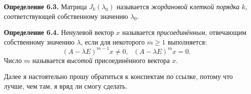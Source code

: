 \documentclass[a4paper, 12pt]{article}
\begin{document}
\begin{spacing}{1.5}
\textbf{Определение 6.3.} Матрица $J_k (\lambda_0)$ называется \textit{жордановой клеткой порядка} $k$, соответствующей собственному значению $\lambda_0$.

\textbf{Определение 6.4.} Ненулевой вектор $x$ называется \textit{присоединённым}, отвечающим собственному значению $\lambda$, если для некоторого $m \geq 1$ выполняется:
$$(A - \lambda E)^{m-1} x \neq 0, \ \ \ (A - \lambda E)^{m} x = 0.$$
Число $m$ называется \textit{высотой} присоединённого вектора $x$.

Далее я настоятельно прошу обратиться к конспектам по ссылке, потому что лучше, чем там, я вряд ли смогу сделать.

\end{spacing}
\end{document}
